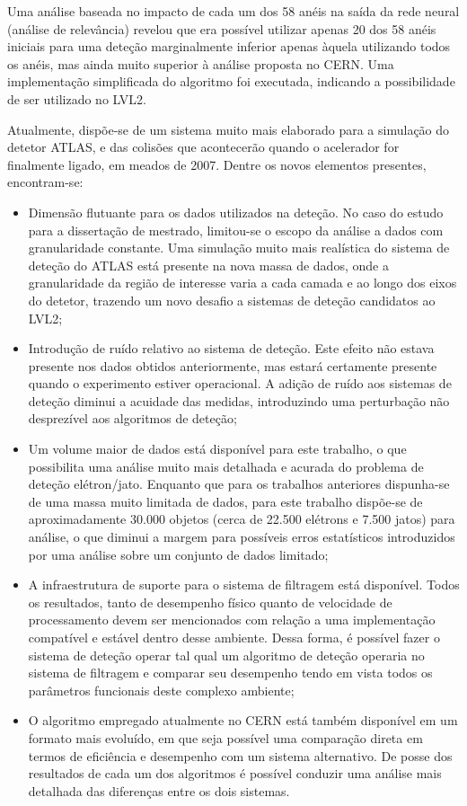 Uma análise baseada no impacto de cada um dos 58 anéis na saída da rede neural
(análise de relevância) revelou que era possível utilizar apenas 20 dos 58
anéis iniciais para uma deteção marginalmente inferior apenas àquela
utilizando todos os anéis, mas ainda muito superior à análise proposta no
CERN. Uma implementação simplificada do algoritmo foi executada, indicando a
possibilidade de ser utilizado no LVL2.

Atualmente, dispõe-se de um sistema muito mais elaborado para a simulação do
detetor ATLAS, e das colisões que acontecerão quando o acelerador for
finalmente ligado, em meados de 2007. Dentre os novos elementos presentes,
encontram-se:

\begin{itemize}
\item Dimensão flutuante para os dados utilizados na deteção. No caso do
estudo para a dissertação de mestrado, limitou-se o escopo da análise a dados
com granularidade constante. Uma simulação muito mais realística do sistema de
deteção do ATLAS está presente na nova massa de dados, onde a granularidade da
região de interesse varia a cada camada e ao longo dos eixos do detetor,
trazendo um novo desafio a sistemas de deteção candidatos ao LVL2;

\item Introdução de ruído relativo ao sistema de deteção. Este efeito não
estava presente nos dados obtidos anteriormente, mas estará certamente
presente quando o experimento estiver operacional. A adição de ruído aos
sistemas de deteção diminui a acuidade das medidas, introduzindo uma
perturbação não desprezível aos algoritmos de deteção;

\item Um volume maior de dados está disponível para este trabalho, o que
possibilita uma análise muito mais detalhada e acurada do problema de deteção
elétron/jato. Enquanto que para os trabalhos anteriores dispunha-se de uma
massa muito limitada de dados, para este trabalho dispõe-se de aproximadamente
30.000 objetos (cerca de 22.500 elétrons e 7.500 jatos) para análise, o que
diminui a margem para possíveis erros estatísticos introduzidos por uma
análise sobre um conjunto de dados limitado;

\item A infraestrutura de suporte para o sistema de filtragem está
disponível. Todos os resultados, tanto de desempenho físico quanto de
velocidade de processamento devem ser mencionados com relação a uma
implementação compatível e estável dentro desse ambiente. Dessa forma, é
possível fazer o sistema de deteção operar tal qual um algoritmo de deteção
operaria no sistema de filtragem e comparar seu desempenho tendo em vista
todos os parâmetros funcionais deste complexo ambiente;

\item O algoritmo empregado atualmente no CERN está também disponível em um
formato mais evoluído, em que seja possível uma comparação direta em termos de
eficiência e desempenho com um sistema alternativo. De posse dos resultados de
cada um dos algoritmos é possível conduzir uma análise mais detalhada das
diferenças entre os dois sistemas.
\end{itemize}

